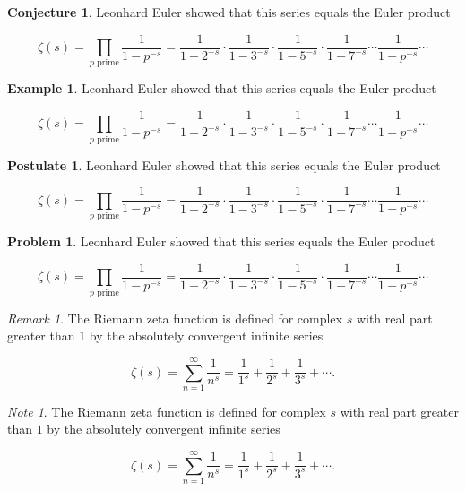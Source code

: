 \documentclass[english,oneside, article]{memoir}
\theoremstyle{plain}
\theoremstyle{definition}
\newtheorem{Conjecture}{Conjecture}[chapter]
\newtheorem{Example}{Example}[chapter]
\newtheorem{Postulate}{Postulate}[chapter]
\newtheorem{Problem}{Problem}[chapter]
\theoremstyle{remark}
\newtheorem*{Remark}{Remark}
\newtheorem*{Note}{Note}
\begin{document}
\begin{Conjecture}

Leonhard Euler showed that this series equals the Euler product

\[\zeta(s) = \prod_{p \text{ prime}} \frac{1}{1-p^{-s}}= \frac{1}{1-2^{-s}}\cdot\frac{1}{1-3^{-s}}\cdot\frac{1}{1-5^{-s}}\cdot\frac{1}{1-7^{-s}} \cdots \frac{1}{1-p^{-s}} \cdots\]

\end{Conjecture}

\begin{Example}

Leonhard Euler showed that this series equals the Euler product

\[\zeta(s) = \prod_{p \text{ prime}} \frac{1}{1-p^{-s}}= \frac{1}{1-2^{-s}}\cdot\frac{1}{1-3^{-s}}\cdot\frac{1}{1-5^{-s}}\cdot\frac{1}{1-7^{-s}} \cdots \frac{1}{1-p^{-s}} \cdots\]

\end{Example}

\begin{Postulate}

Leonhard Euler showed that this series equals the Euler product

\[\zeta(s) = \prod_{p \text{ prime}} \frac{1}{1-p^{-s}}= \frac{1}{1-2^{-s}}\cdot\frac{1}{1-3^{-s}}\cdot\frac{1}{1-5^{-s}}\cdot\frac{1}{1-7^{-s}} \cdots \frac{1}{1-p^{-s}} \cdots\]

\end{Postulate}

\begin{Problem}

Leonhard Euler showed that this series equals the Euler product

\[\zeta(s) = \prod_{p \text{ prime}} \frac{1}{1-p^{-s}}= \frac{1}{1-2^{-s}}\cdot\frac{1}{1-3^{-s}}\cdot\frac{1}{1-5^{-s}}\cdot\frac{1}{1-7^{-s}} \cdots \frac{1}{1-p^{-s}} \cdots\]

\end{Problem}

\begin{Remark}

The Riemann zeta function is defined for complex \(s\) with real part
greater than \(1\) by the absolutely convergent infinite series

\[\zeta(s) = \sum_{n=1}^\infty \frac{1}{n^s} = \frac{1}{1^s} + \frac{1}{2^s} + \frac{1}{3^s} + \cdots.\]

\end{Remark}

\begin{Note}

The Riemann zeta function is defined for complex \(s\) with real part
greater than \(1\) by the absolutely convergent infinite series

\[\zeta(s) = \sum_{n=1}^\infty \frac{1}{n^s} = \frac{1}{1^s} + \frac{1}{2^s} + \frac{1}{3^s} + \cdots.\]

\end{Note}
\end{document}
